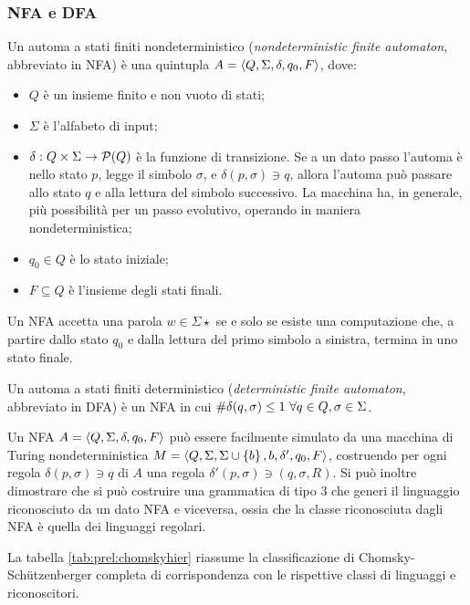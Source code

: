 \subsubsection{NFA e DFA}
\begin{defin}
	Un automa a stati finiti nondeterministico (\emph{nondeterministic finite automaton}, abbreviato in NFA) è una quintupla $A=\langle Q,\Sigma,\delta,q_0,F \rangle$, dove:
	\begin{itemize}
		\item $Q$ è un insieme finito e non vuoto di stati;
		\item $\Sigma$ è l'alfabeto di input;
		\item $\delta:Q\times\Sigma\to\mathcal P(Q)$ è la funzione di transizione. Se a un dato passo l'automa è nello stato $p$, legge il simbolo $\sigma$, e $\delta(p,\sigma)\ni q$, allora l'automa può passare allo stato $q$ e alla lettura del simbolo successivo. La macchina ha, in generale, più possibilità per un passo evolutivo, operando in maniera nondeterministica;
		\item $q_0\in Q$ è lo stato iniziale;
		\item $F\subseteq Q$ è l'insieme degli stati finali.
	\end{itemize}
	Un NFA accetta una parola $w\in\Sigma\star$ se e solo se esiste una computazione che, a partire dallo stato $q_0$ e dalla lettura del primo simbolo a sinistra, termina in uno stato finale.
\end{defin}
\begin{defin}
	Un automa a stati finiti deterministico (\emph{deterministic finite automaton}, abbreviato in DFA) è un NFA in cui $\# \delta(q,\sigma)\leq 1 ~ \forall q\in Q,\sigma\in\Sigma$.
\end{defin}

Un NFA $A=\langle Q,\Sigma,\delta,q_0,F \rangle$ può essere facilmente simulato da una macchina di Turing nondeterministica $M=\langle Q,\Sigma,\Sigma\cup\left\{ b \right\},b,\delta',q_0,F \rangle$, costruendo per ogni regola $\delta(p,\sigma)\ni q$ di $A$ una regola $\delta'(p,\sigma)\ni (q,\sigma,R)$. Si può inoltre dimostrare che si può costruire una grammatica di tipo 3 che generi il linguaggio riconosciuto da un dato NFA e viceversa, ossia che la classe riconosciuta dagli NFA è quella dei linguaggi regolari.

La tabella \ref{tab:prel:chomskyhier} riassume la classificazione di Chomsky-Schützenberger completa di corrispondenza con le rispettive classi di linguaggi e riconoscitori.

